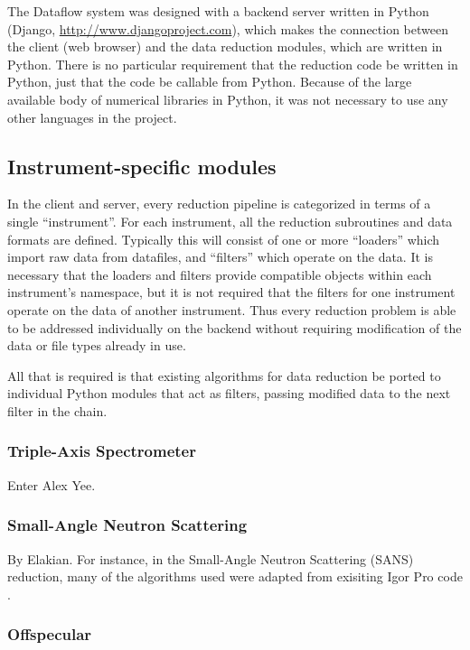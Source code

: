 \documentclass[pdf]{iucr}           %
\begin{document}
The Dataflow system was designed with a backend server written in Python (Django, \url{http://www.djangoproject.com}),
which makes the connection between the client (web browser) and the data reduction modules, which are written 
in Python.  There is no particular requirement that the reduction code be written in Python, just that
the code be callable from Python.  Because of the large available body of numerical libraries 
in Python, it was not necessary to use any other languages in the project.  

\subsection{Instrument-specific modules}

In the client and server, every reduction pipeline is categorized in terms of a single ``instrument''.
For each instrument, all the reduction subroutines and data formats are defined.  Typically this will
consist of one or more ``loaders'' which import raw data from datafiles, and ``filters'' which operate
on the data.  It is necessary that the loaders and filters provide compatible objects within each
instrument's namespace, but it is not required that the filters for one instrument operate on the data
of another instrument.  Thus every reduction problem is able to be addressed individually on the backend
without requiring modification of the data or file types already in use.  

All that is required is that
existing algorithms for data reduction be ported to individual Python modules that act as filters, 
passing modified data to the next filter in the chain.  

\subsubsection{Triple-Axis Spectrometer}

Enter Alex Yee.

\subsubsection{Small-Angle Neutron Scattering}

By Elakian.
For instance, in the Small-Angle Neutron Scattering (SANS) reduction, many of the algorithms used were 
adapted from exisiting Igor Pro code \cite{Kline:do5025}.

\subsubsection{Offspecular}
\end{document}
